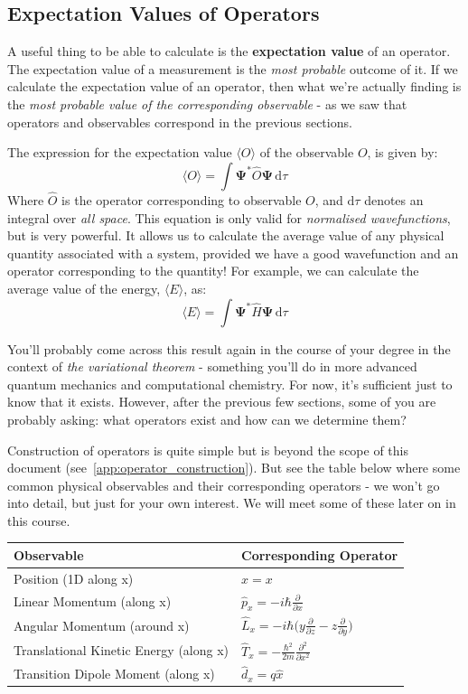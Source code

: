 \documentclass{memoir}[11pt,oneside,a4paper,openany]
\newcommand{\wf}{\ensuremath{\bm{\Psi}}\xspace}
\begin{document}
\subsection{Expectation Values of Operators}
A useful thing to be able to calculate is the \textbf{expectation value} of an operator. The expectation value of a measurement is the \emph{most probable} outcome of it. If we calculate the expectation value of an operator, then what we're actually finding is the \emph{most probable value of the corresponding observable} - as we saw that operators and observables correspond in the previous sections.

The expression for the expectation value $\langle O \rangle$ of the observable $O$, is given by:
\begin{equation}
	\langle O \rangle = \int \wf^* \hat{O} \wf \,\mathrm{d}\tau
\end{equation}
Where $\hat{O}$ is the operator corresponding to observable $O$, and $\mathrm{d}\tau$ denotes an integral over \emph{all space}. This equation is only valid for \emph{normalised wavefunctions}, but is very powerful. It allows us to calculate the average value of any physical quantity associated with a system, provided we have a good wavefunction and an operator corresponding to the quantity! For example, we can calculate the average value of the energy, $\langle E \rangle$, as:
\begin{equation}
	\langle E \rangle = \int \wf^* \hat{H} \wf \,\mathrm{d}\tau
\end{equation}

You'll probably come across this result again in the course of your degree in the context of \emph{the variational theorem} - something you'll do in more advanced quantum mechanics and computational chemistry. For now, it's sufficient just to know that it exists. However, after the previous few sections, some of you are probably asking: what operators exist and how can we determine them?

Construction of operators is quite simple but is beyond the scope of this document (see~\autoref{app:operator_construction}). But see the table below where some common physical observables and their corresponding operators - we won't go into detail, but just for your own interest. We will meet some of these later on in this course. 
\begin{table}[h!]
	\centering
\begin{tabular}{@{}ll@{}}
\toprule
Observable & Corresponding Operator \\ \midrule
Position (1D along x) & $\hat{x} = x$ \\
Linear Momentum (along x) & $\hat{p}_x = -i\hbar \frac{\partial}{\partial x}$ \\
Angular Momentum (around x) & $\hat{L}_x = -i\hbar \big( y\frac{\partial}{\partial z} - z \frac{\partial}{\partial y} \big)$  \\
Translational Kinetic Energy (along x)	& $\hat{T}_x = -\frac{\hbar^2}{2m} \frac{\partial^2}{\partial x^2}$ \\
Transition Dipole Moment (along x) &  $\hat{d}_x = q\hat{x}$ \\ \bottomrule
\end{tabular}
\end{table}
\vfill
\end{document}
